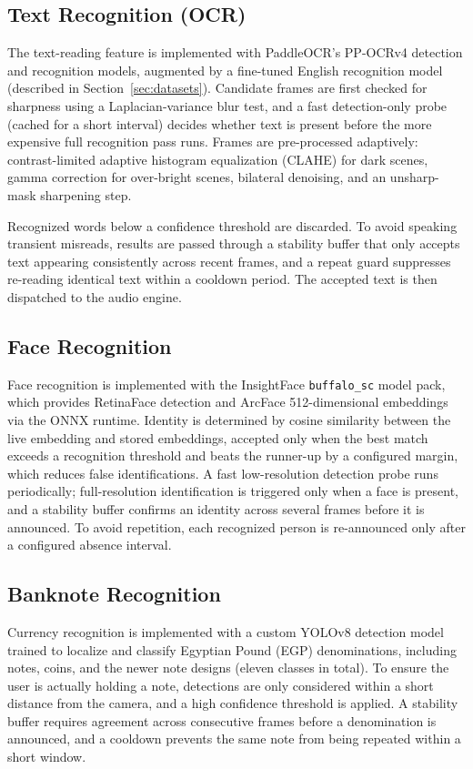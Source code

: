 \subsection{Text Recognition (OCR)}

The text-reading feature is implemented with PaddleOCR's PP-OCRv4 detection and recognition models, augmented by a fine-tuned English recognition model (described in Section~\ref{sec:datasets}). Candidate frames are first checked for sharpness using a Laplacian-variance blur test, and a fast detection-only probe (cached for a short interval) decides whether text is present before the more expensive full recognition pass runs. Frames are pre-processed adaptively: contrast-limited adaptive histogram equalization (CLAHE) for dark scenes, gamma correction for over-bright scenes, bilateral denoising, and an unsharp-mask sharpening step.

Recognized words below a confidence threshold are discarded. To avoid speaking transient misreads, results are passed through a stability buffer that only accepts text appearing consistently across recent frames, and a repeat guard suppresses re-reading identical text within a cooldown period. The accepted text is then dispatched to the audio engine.

\subsection{Face Recognition}

Face recognition is implemented with the InsightFace \texttt{buffalo\_sc} model pack, which provides RetinaFace detection and ArcFace 512-dimensional embeddings via the ONNX runtime. Identity is determined by cosine similarity between the live embedding and stored embeddings, accepted only when the best match exceeds a recognition threshold and beats the runner-up by a configured margin, which reduces false identifications. A fast low-resolution detection probe runs periodically; full-resolution identification is triggered only when a face is present, and a stability buffer confirms an identity across several frames before it is announced. To avoid repetition, each recognized person is re-announced only after a configured absence interval.

\subsection{Banknote Recognition}

Currency recognition is implemented with a custom YOLOv8 detection model trained to localize and classify Egyptian Pound (EGP) denominations, including notes, coins, and the newer note designs (eleven classes in total). To ensure the user is actually holding a note, detections are only considered within a short distance from the camera, and a high confidence threshold is applied. A stability buffer requires agreement across consecutive frames before a denomination is announced, and a cooldown prevents the same note from being repeated within a short window.

